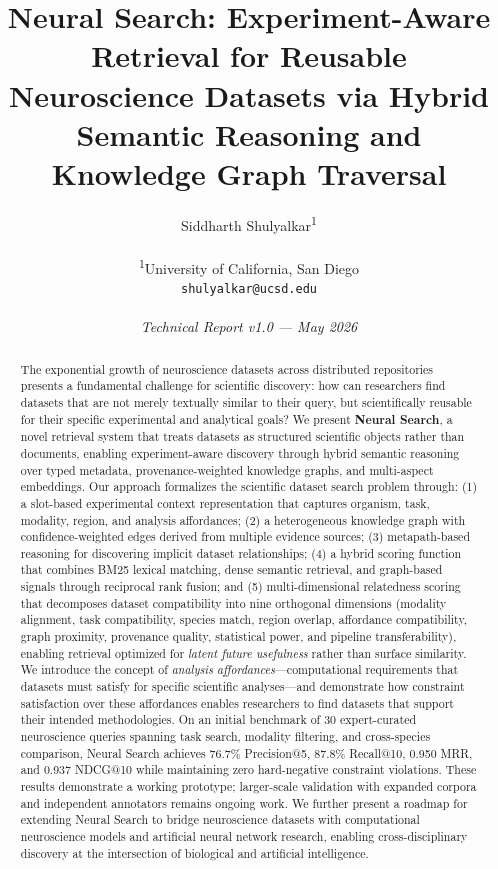 \documentclass{article}
\title{
    \textbf{Neural Search: Experiment-Aware Retrieval for Reusable Neuroscience Datasets via Hybrid Semantic Reasoning and Knowledge Graph Traversal}
}
\author{
    Siddharth Shulyalkar\textsuperscript{1}\\
    \\
    \textsuperscript{1}University of California, San Diego\\
    \texttt{shulyalkar@ucsd.edu}\\
    \\
    \textit{Technical Report v1.0 --- May 2026}
}
\date{}
\theoremstyle{definition}
\begin{document}
\maketitle

\begin{abstract}
The exponential growth of neuroscience datasets across distributed repositories presents a fundamental challenge for scientific discovery: how can researchers find datasets that are not merely textually similar to their query, but scientifically reusable for their specific experimental and analytical goals? We present \textbf{Neural Search}, a novel retrieval system that treats datasets as structured scientific objects rather than documents, enabling experiment-aware discovery through hybrid semantic reasoning over typed metadata, provenance-weighted knowledge graphs, and multi-aspect embeddings. Our approach formalizes the scientific dataset search problem through: (1) a slot-based experimental context representation that captures organism, task, modality, region, and analysis affordances; (2) a heterogeneous knowledge graph with confidence-weighted edges derived from multiple evidence sources; (3) metapath-based reasoning for discovering implicit dataset relationships; (4) a hybrid scoring function that combines BM25 lexical matching, dense semantic retrieval, and graph-based signals through reciprocal rank fusion; and (5) multi-dimensional relatedness scoring that decomposes dataset compatibility into nine orthogonal dimensions (modality alignment, task compatibility, species match, region overlap, affordance compatibility, graph proximity, provenance quality, statistical power, and pipeline transferability), enabling retrieval optimized for \textit{latent future usefulness} rather than surface similarity. We introduce the concept of \textit{analysis affordances}---computational requirements that datasets must satisfy for specific scientific analyses---and demonstrate how constraint satisfaction over these affordances enables researchers to find datasets that support their intended methodologies. On an initial benchmark of 30 expert-curated neuroscience queries spanning task search, modality filtering, and cross-species comparison, Neural Search achieves 76.7\% Precision@5, 87.8\% Recall@10, 0.950 MRR, and 0.937 NDCG@10 while maintaining zero hard-negative constraint violations. These results demonstrate a working prototype; larger-scale validation with expanded corpora and independent annotators remains ongoing work. We further present a roadmap for extending Neural Search to bridge neuroscience datasets with computational neuroscience models and artificial neural network research, enabling cross-disciplinary discovery at the intersection of biological and artificial intelligence.
\end{abstract}
\end{document}
